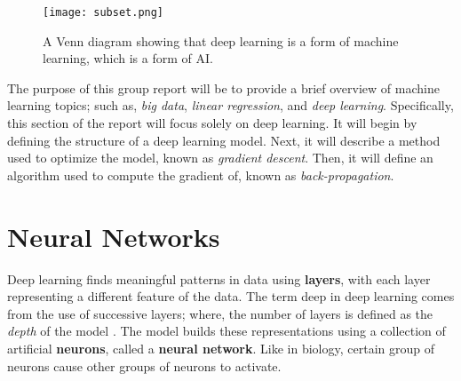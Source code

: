 \documentclass[12pt]{article}
\begin{document}
\begin{figure}[h]
    \centering
    \texttt{[image: subset.png]}
    \caption{A Venn diagram showing that deep learning is a form of machine learning, which is a form of AI.}
    \label{fig:subset}
\end{figure}
The purpose of this group report will be to provide a brief overview of machine learning topics; such as, \textit{big data}, \textit{linear regression}, and \textit{deep learning}. Specifically, this section of the report will focus solely on deep learning.  It will begin by defining the structure of a deep learning model. Next, it will describe a method used to optimize the model,  known as \textit{gradient descent}. Then, it will define an algorithm used to compute the gradient of, known as \textit{back-propagation}.
\newpage
\section*{Neural Networks}
Deep learning finds meaningful patterns in data using \textbf{layers}, with each layer representing a different feature of the data\cite{goodfellow2016deep}. The term deep in deep learning comes from the use of successive layers; where, the number of layers is defined as the \textit{depth} of the model \cite{pythondeeplearning}. The model builds these representations using a collection of artificial \textbf{neurons}, called a \textbf{neural network}\cite{pythondeeplearning}. Like in biology, certain group of neurons cause other groups of neurons to activate.
\end{document}
